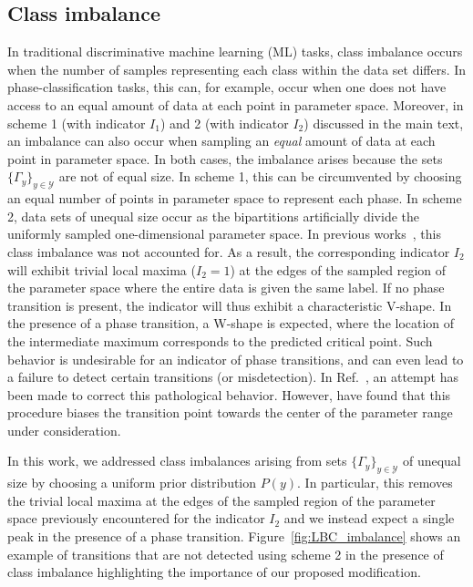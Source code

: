 \documentclass[twocolumn,aps,pra,superscriptaddress,tightlines,nofootinbib]{revtex4-2}
\begin{document}
	\subsection{Class imbalance}\label{sec_class_imb}
	In traditional discriminative machine learning (ML) tasks, class imbalance occurs when the number of samples representing each class within the data set differs. In phase-classification tasks, this can, for example, occur when one does not have access to an equal amount of data at each point in parameter space. Moreover, in scheme 1 (with indicator $I_{1}$) and 2 (with indicator $I_{2}$) discussed in the main text, an imbalance can also occur when sampling an \emph{equal} amount of data at each point in parameter space. In both cases, the imbalance arises because the sets $\{ \Gamma_{y}\}_{y \in \mathcal{Y}}$ are not of equal size. In scheme 1, this can be circumvented by choosing an equal number of points in parameter space to represent each phase. In scheme 2, data sets of unequal size occur as the bipartitions artificially divide the uniformly sampled one-dimensional parameter space. In previous works~\cite{van:2017,liu:2018,beach:2018,suchsland:2018,lee:2019,kharkov:2020,guo:2020,greplova:2020,bohrdt:2021,richter:2022,gavreev:2022,zvyagintseva:2022,guo:2023,schlomer:2023}, this class imbalance was not accounted for. As a result, the corresponding indicator $I_{2}$ will exhibit trivial local maxima ($I_{2}=1$) at the edges of the sampled region of the parameter space where the entire data is given the same label. If no phase transition is present, the indicator will thus exhibit a characteristic V-shape. In the presence of a phase transition, a W-shape is expected, where the location of the intermediate maximum corresponds to the predicted critical point. Such behavior is undesirable for an indicator of phase transitions, and can even lead to a failure to detect certain transitions (or misdetection). In Ref.~\cite{bohrdt:2021}, an attempt has been made to correct this pathological behavior. However, \citet{arnold:2022} have found that this procedure biases the transition point towards the center of the parameter range under consideration.
	
	In this work, we addressed class imbalances arising from sets $\{ \Gamma_{y}\}_{y \in \mathcal{Y}}$ of unequal size by choosing a uniform prior distribution $P(y)$. In particular, this removes the trivial local maxima at the edges of the sampled region of the parameter space previously encountered for the indicator $I_{2}$ and we instead expect a single peak in the presence of a phase transition. Figure~\ref{fig:LBC_imbalance} shows an example of transitions that are not detected using scheme 2 in the presence of class imbalance highlighting the importance of our proposed modification.
	
\end{document}
